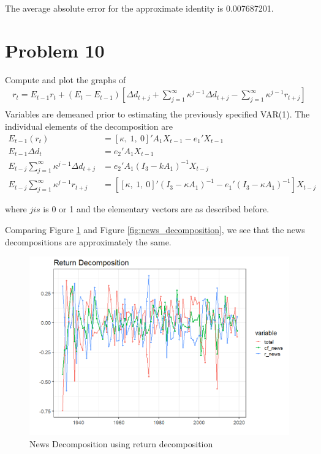 \documentclass[11pt,letter]{article}
\begin{document}
The average absolute error for the 
approximate identity  is
0.007687201. 
\section*{Problem 10}
Compute and plot the graphs of 
\begin{align*}
r_{t}   =E_{t-1}r_{t} + (E_{t}-E_{t-1}) \left[ \Delta d_{t+j} + \sum^\infty_{j=1} \kappa^{j-1} \Delta d_{t+j} - \sum^\infty_{j=1} \kappa^{j-1} r_{t+j}\right]\\
\end{align*}
Variables are demeaned prior to estimating the previously specified VAR(1). The individual elements of the decomposition are 
\begin{equation*}
	\begin{split}
	 E_{t-1}(r_t) &= [\kappa,\ 1,\ 0]'A_1X_{t-1}-e_1'X_{t-1}\\
	  E_{t-1}\Delta d_t &= e_2'A_1X_{t-1}\\
	  E_{t-j}\sum^\infty_{j=1}\kappa^{j-1}\Delta d_{t+j} &= e_2' A_1(I_3-kA_1)^{-1}X_{t-j}\\
	  E_{t-j}\sum^\infty_{j=1}\kappa^{j-1}r_{t+j} &= \left[ [\kappa,\ 1,\ 0]' (I_3 - \kappa A_1)^{-1} -e_1' ( I_3 -\kappa A_1)^{-1} \right]X_{t-j}
	\end{split}
\end{equation*}


where $j is$ is 0 or 1 and the elementary vectors are as described before. 

Comparing Figure \ref{fig:news_decomposition_returns} and Figure \ref{fig:news_decomposition}, we see that the news decompositions are approximately the same. 

\begin{figure}[!htb]
	\centering
	\includegraphics[scale = 0.5]{return_decomposition_returns.png}
	\caption{News Decomposition using return decomposition}
	\label{fig:news_decomposition_returns}
\end{figure}
\end{document}
